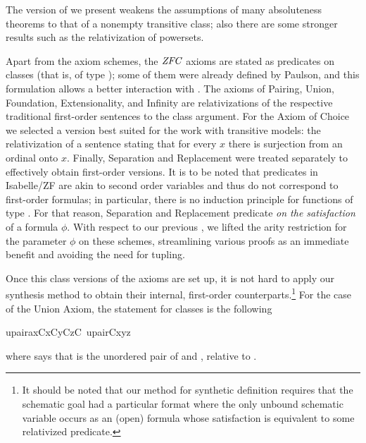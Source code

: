 The version of  we present weakens the
assumptions of many absoluteness theorems to that
of a nonempty transitive class; also there are some stronger results
such as the relativization of powersets.

Apart from the axiom schemes, the $\mathit{ZFC}$ 
axioms are stated as predicates on classes (that is,
of type ); some
of them were already defined by Paulson, and this formulation allows a
better interaction with . 
The axioms of Pairing, Union, Foundation,
Extensionality, and Infinity are relativizations of the respective
traditional 
first-order sentences to the class argument. For the Axiom of Choice
we selected a version best suited for the work with transitive
models: the relativization of a sentence stating that for every $x$
there is surjection from an ordinal onto $x$. Finally, Separation and
Replacement were treated separately to effectively obtain first-order
versions. It is to be noted that predicates in Isabelle/ZF are akin to
second order variables and thus do not correspond to first-order
formulas; in particular, there is no induction principle for functions
of type . For that reason, Separation and
Replacement predicate \emph{on the satisfaction} of a formula $\phi$.
With respect to our previous \cite{2019arXiv190103313G}, we lifted the
arity restriction for the parameter $\phi$ on these schemes,
streamlining various proofs as an immediate benefit and avoiding the
need for tupling.

Once this class versions of the axioms are set up, it is not hard to
apply our synthesis method to obtain their internal, first-order
counterparts.\footnote{It should be noted that our method for
  synthetic definition requires that the schematic goal had a
  particular format where the only unbound schematic variable occurs
  as an (open) formula whose satisfaction is equivalent to some
  relativized predicate.}
For the case of the Union Axiom, the statement for classes is the
following
\begin{isabelle}
upair{\isacharunderscore}ax{\isacharparenleft}C{\isacharparenright}{\isacharequal}{\isacharequal}{\isasymforall}x{\isacharbrackleft}C{\isacharbrackright}{\isachardot}{\isasymforall}y{\isacharbrackleft}C{\isacharbrackright}{\isachardot}{\isasymexists}z{\isacharbrackleft}C{\isacharbrackright}{\isachardot}\ upair{\isacharparenleft}C{\isacharcomma}x{\isacharcomma}y{\isacharcomma}z{\isacharparenright}
\end{isabelle}
where  says that  is the unordered pair of
 and , relative to .

